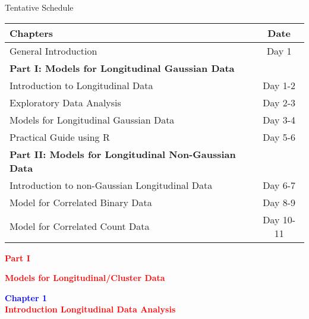 \documentclass{beamer}
\begin{document}
\begin{frame}{Tentative Schedule}
\begin{table}
	\begin{center}
		\begin{tabular}{|l|c|}
			\hline \hline
			\bf{Chapters} & \bf{Date}\\
			\hline \hline
			General Introduction & Day 1\\
			\hline
			\bf{Part I: Models for Longitudinal Gaussian Data} & \\
			\hline
			Introduction to Longitudinal Data & Day 1-2\\
			\hline
			Exploratory Data Analysis &Day 2-3\\
			\hline
			Models for Longitudinal Gaussian Data &Day 3-4\\
			\hline
			Practical Guide using R & Day 5-6\\
			\hline
			\bf{Part II: Models for Longitudinal Non-Gaussian Data} & \\
			\hline
			Introduction to non-Gaussian Longitudinal Data & Day 6-7\\
			\hline
			Model for Correlated Binary Data&Day 8-9\\
			\hline
			Model for Correlated Count Data&Day 10-11\\
			\hline
		\end{tabular}
	\end{center}
\end{table}
\end{frame}




\begin{frame}

\centering
\large

\textbf{{\textcolor{red}{Part I}}}
\vspace{5mm}

\textbf{{\textcolor{red}{Models for Longitudinal/Cluster Data}}}

\end{frame}

\begin{frame}
\centering
\Large
\textbf{\textcolor{blue} {Chapter 1}}\\
\vspace*{3mm}
\textbf{\textcolor{red} {Introduction Longitudinal Data Analysis}}
\end{frame}
\end{document}
